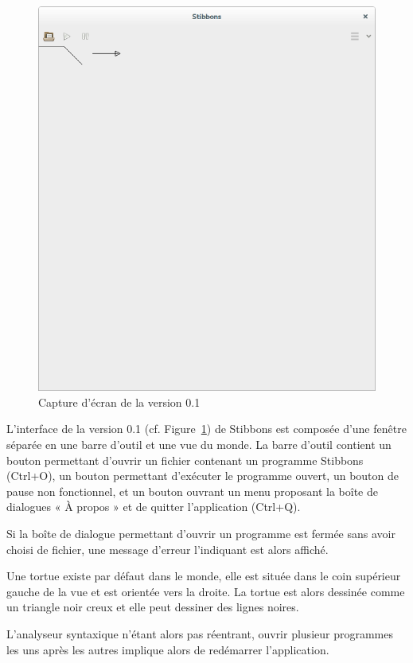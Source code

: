 \begin{figure}[h]
\includegraphics[scale=0.25]{doc/report/screenshot/stibbons-0-1-2.png}
\caption{\label{screenshot-0.1} Capture d'écran de la version 0.1}
\end{figure}

L'interface de la version 0.1 (cf. Figure~\ref{screenshot-0.1}) de Stibbons est composée d'une fenêtre séparée en une barre d'outil et une vue du monde.
La barre d'outil contient un bouton permettant d'ouvrir un fichier contenant un programme Stibbons (Ctrl+O), un bouton permettant d'exécuter le programme ouvert, un bouton de pause non fonctionnel, et un bouton ouvrant un menu proposant la boîte de dialogues « À propos » et de quitter l'application (Ctrl+Q).

Si la boîte de dialogue permettant d'ouvrir un programme est fermée sans avoir choisi de fichier, une message d'erreur l'indiquant est alors affiché.

Une tortue existe par défaut dans le monde, elle est située dans le coin supérieur gauche de la vue et est orientée vers la droite. La tortue est alors dessinée comme un triangle noir creux et elle peut dessiner des lignes noires.

L'analyseur syntaxique n'étant alors pas réentrant, ouvrir plusieur programmes les uns après les autres implique alors de redémarrer l'application.

